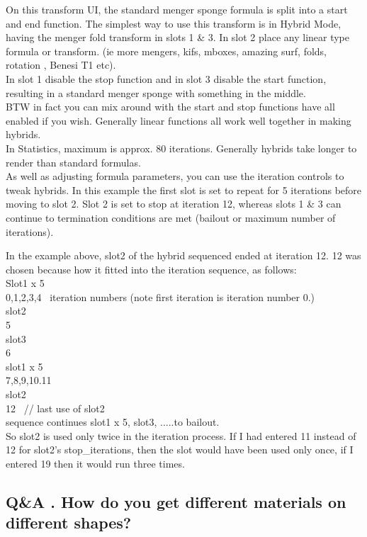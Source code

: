 On this transform UI, the standard menger sponge formula is split into a
start and end function. The simplest way to use this transform is in
Hybrid Mode, having the menger fold transform in slots 1 \& 3. In slot 2
place any linear type formula or transform. (ie more mengers, kifs,
mboxes, amazing surf, folds, rotation , Benesi T1
etc).\\[2\baselineskip]In slot 1 disable the stop function and in slot 3
disable the start function, resulting in a standard menger sponge with
something in the middle.\\[2\baselineskip]BTW in fact you can mix around
with the start and stop functions have all enabled if you wish.
Generally linear functions all work well together in making
hybrids.\\[2\baselineskip]In Statistics, maximum is approx. 80
iterations. Generally hybrids take longer to render than standard
formulas.\\
As well as adjusting formula parameters, you can use the iteration
controls to tweak hybrids. In this example the first slot is set to
repeat for 5 iterations before moving to slot 2. Slot 2 is set to stop
at iteration 12, whereas slots 1 \& 3 can continue to termination
conditions are met (bailout or maximum number of iterations).

In the example above, slot2 of the hybrid sequenced ended at iteration
12. 12 was chosen because how it fitted into the iteration sequence, as
follows:\\
Slot1 x 5\\
0,1,2,3,4~ iteration numbers (note first iteration is iteration number
0.)\\
slot2\\
5\\
slot3~\\
6\\
slot1 x 5\\
7,8,9,10.11\\
slot2\\
12~ // last use of slot2\\
\hspace*{0.333em}sequence continues slot1 x 5, slot3, .....to bailout.\\
So slot2 is used only twice in the iteration process. If I had entered
11 instead of 12 for slot2's stop\_iterations, then the slot would have
been used only once, if I entered 19 then it would run three times.

\subsection{Q\&A . How do you get different materials on different
shapes?}\label{qa-.-how-do-you-get-different-materials-on-different-shapes}

